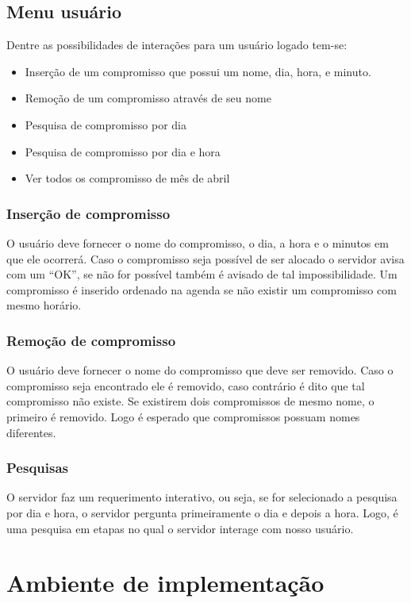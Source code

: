 \documentclass[10pt,a4paper]{article}
\begin{document}
\subsection{Menu usuário}
Dentre as possibilidades de interações para um usuário logado tem-se:

\begin{itemize}
\item Inserção de um compromisso que possui um nome, dia, hora, e minuto. 
\item Remoção de um compromisso através de seu nome
\item Pesquisa de compromisso por dia
\item Pesquisa de compromisso por dia e hora
\item Ver todos os compromisso de mês de abril
\end{itemize}

\subsubsection{Inserção de compromisso}
O usuário deve fornecer o nome do compromisso, o dia, a hora e o
minutos em que ele ocorrerá.
Caso o compromisso seja possível de ser alocado o servidor avisa com
um ``OK'', se não for possível também é avisado de tal impossibilidade.
Um compromisso é inserido ordenado na agenda se não existir um
compromisso com mesmo horário.

\subsubsection{Remoção de compromisso}
O usuário deve fornecer o nome do compromisso que deve ser removido.
Caso o compromisso seja encontrado ele é removido, caso contrário é
dito que tal compromisso não existe.
Se existirem dois compromissos de mesmo nome, o primeiro é removido.
Logo é esperado que compromissos possuam nomes diferentes.


\subsubsection{Pesquisas}
O servidor faz um requerimento interativo, ou seja, se for selecionado
a pesquisa por dia e hora, o servidor pergunta primeiramente o dia e
depois a hora. Logo, é uma pesquisa em etapas no qual o servidor
interage com nosso usuário.

\section{Ambiente de implementação}
\end{document}
